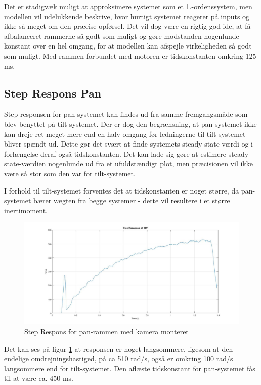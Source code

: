 Det er stadigvæk muligt at approksimere systemet som et 1.-ordenssystem, men modellen vil udelukkende beskrive, hvor hurtigt systemet reagerer på inputs og ikke så meget om den præcise opførsel. Det vil dog være en rigtig god ide, at få afbalanceret rammerne så godt som muligt og gøre modstanden nogenlunde konstant over en hel omgang, for at modellen kan afspejle virkeligheden så godt som muligt. Med rammen forbundet med motoren er tidskonstanten omkring 125 ms.

\subsection{Step Respons Pan}

Step responsen for pan-systemet kan findes ud fra samme fremgangsmåde som blev benyttet på tilt-systemet. Der er dog den begrænsning, at pan-systemet ikke kan dreje ret meget mere end en halv omgang før ledningerne til tilt-systemet bliver spændt ud. Dette gør det svært at finde systemets steady state værdi og i forlængelse deraf også tidskonstanten. Det kan lade sig gøre at estimere steady state-værdien nogenlunde ud fra et ufuldstændigt plot, men præcisionen vil ikke være så stor som den var for tilt-systemet. 

I forhold til tilt-systemet forventes det at tidskonstanten er noget større, da pan-systemet bærer vægten fra begge systemer - dette vil resultere i et større inertimoment. 

\begin{figure}[!ht]
	\begin{center}
		\includegraphics[scale=0.31]{Billeder/Pan_Response.jpg}
	\end{center}
	\caption{Step Respons for pan-rammen med kamera monteret}
	\label{fig:Pan_Response}
\end{figure}

Det kan ses på figur \ref{fig:Pan_Response} at responsen er noget langsommere, ligesom at den endelige omdrejningshastiged, på ca 510 rad/s, også er omkring 100 rad/s langsommere end for tilt-systemet. Den aflæste tidskonstant for pan-systemet fås til at være ca. 450 ms.

